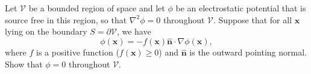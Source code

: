 \documentclass[11pt]{article}
\renewcommand{\vec}[1]{\mathbf{#1}}
\newcommand{\beqn}{\begin{equation}}
\newcommand{\eeqn}{\end{equation}}
\newenvironment{statement}[1]
{
	\section{#1}
	\color{darkgray}
	\ignorespaces
}
{
}
\begin{document}
\newcommand{\cV}{\mathcal{V}}
\newcommand{\lap}{\nabla^2}
\newcommand{\vx}{\vec{x}}
\newcommand{\dV}{\partial \cV}
\newcommand{\nh}{\vec{\hat{n}}}
\newcommand{\dcx}{\dd[3]{x}}
\newcommand{\vE}{\vec{E}}
\newcommand{\En}{E_n}

\newcommand{\dS}{\dd{S}}

\begin{statement}{}
	Let $\cV$ be a bounded region of space and let $\phi$ be an electrostatic potential that is source free in this region, so that $\lap\phi = 0$ throughout $\cV$.  Suppose that for all $\vx$ lying on the boundary $S = \dV$, we have
	\beqn \label{given}
		\phi(\vx) = -f(\vx) \nh \cdot \nabla \phi(\vx),
	\eeqn
	where $f$ is a positive function ($f(\vx) \geq 0$) and $\nh$ is the outward pointing normal.  Show that $\phi = 0$ throughout $\cV$.
\end{statement}
\end{document}
